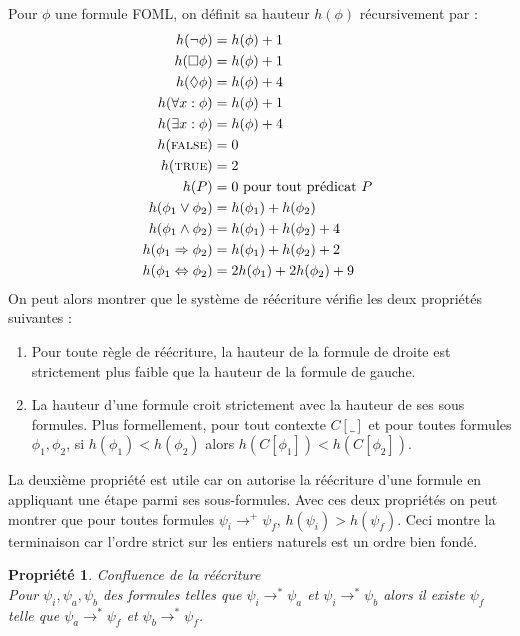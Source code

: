 \documentclass[12pt]{article}
\newcommand{\TRUE}{\textsc{true}}
\newcommand{\FALSE}{\textsc{false}}
\newtheorem{prop}{Propriété}
\begin{document}
Pour $\phi$ une formule FOML, on définit sa hauteur \( h(\phi) \) récursivement par :
\begin{align*}
  h(\neg \phi) & = h(\phi) + 1 \\
  h(\Box \phi) & = h(\phi) + 1 \\
  h(\Diamond \phi) & = h(\phi) + 4 \\
  h(\forall x : \phi) & = h(\phi) + 1 \\
  h(\exists x : \phi) & = h(\phi) + 4 \\
  h(\FALSE) & = 0 \\
  h(\TRUE) & = 2 \\
  h(P) & = 0 \textup{ pour tout prédicat \(P\) } \\
  h(\phi_1 \lor \phi_2) & = h(\phi_1) + h(\phi_2) \\
  h(\phi_1 \land \phi_2) & = h(\phi_1) + h(\phi_2) + 4\\
  h(\phi_1 \Rightarrow \phi_2) & = h(\phi_1) + h(\phi_2) + 2\\
  h(\phi_1 \Leftrightarrow \phi_2) & = 2h(\phi_1) + 2h(\phi_2) + 9
\end{align*}
On peut alors montrer que le système de réécriture vérifie les deux propriétés suivantes :
\begin{enumerate}
\item Pour toute règle de réécriture, la hauteur de la formule de droite est strictement plus faible que la hauteur de la formule de gauche.
\item La hauteur d'une formule croit strictement avec la hauteur de ses sous formules.
  Plus formellement, pour tout contexte \( C[\_] \) et pour toutes formules \( \phi_1, \phi_2 \), si \( h(\phi_1) < h(\phi_2) \) alors \( h(C[\phi_1]) < h(C[\phi_2]) \).
\end{enumerate}

La deuxième propriété est utile car on autorise la réécriture d'une formule en appliquant une étape parmi ses sous-formules.
Avec ces deux propriétés on peut montrer que pour toutes formules \( \psi_i \longrightarrow^+ \psi_f \), \( h(\psi_i) > h(\psi_f) \).
Ceci montre la terminaison car l'ordre strict sur les entiers naturels est un ordre bien fondé.

\begin{prop} \emph{Confluence de la réécriture} \\
  Pour \( \psi_i, \psi_a, \psi_b \) des formules telles que \( \psi_i \longrightarrow^* \psi_a \) et \( \psi_i \longrightarrow^* \psi_b \) alors il existe \( \psi_f \) telle que \( \psi_a \longrightarrow^* \psi_f \) et \( \psi_b \longrightarrow^* \psi_f \).
\end{prop}
\end{document}
